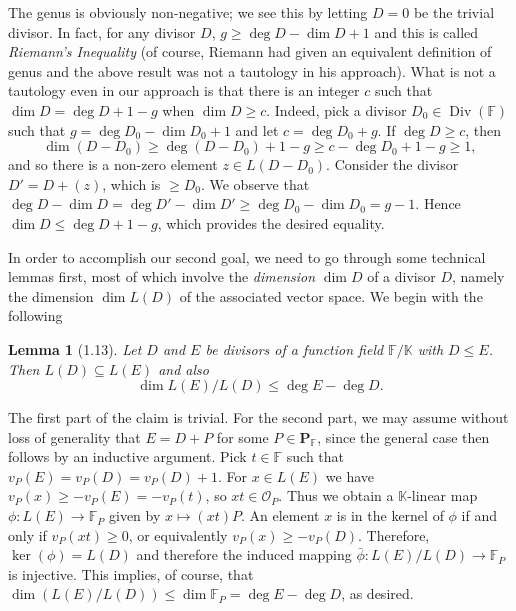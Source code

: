 \documentclass[11pt]{article}
\makeatletter
\theoremstyle{scplain}
\newtheorem*{lemma}{Lemma}
\renewenvironment{proof}[1][\proofname]{%
  \par\pushQED{\qed}\normalfont\topsep6\p@\@plus6\p@\relax
  \trivlist\item[\hskip\labelsep\scshape #1\@addpunct{.}]\ignorespaces}%
  {\popQED\endtrivlist\@endpefalse}
\DeclareMathOperator{\Div}{Div}
\makeatother
\begin{document}
\setlength{\emergencystretch}{2em}

The genus is obviously non-negative; we see this by letting $D = 0$ be the
trivial divisor. In fact, for any divisor $D$, $g \geq \deg D - \dim D + 1$ and
this is called \emph{Riemann's Inequality} (of course, Riemann had given an
equivalent definition of genus and the above result was not a tautology in his
approach). What is not a tautology even in our approach is that there is an
integer $c$ such that $\dim D = \deg D + 1 - g$ when $\dim D \geq c$. Indeed,
pick a divisor $D_0 \in \Div(\mathbb{F})$ such that
$g = \deg D_0 - \dim D_0 + 1$ and let $c = \deg D_0 + g$. If $\deg D \geq c$,
then
\[
  \dim(D - D_0) \geq \deg(D - D_0) + 1 - g
    \geq c - \deg D_0 + 1 - g \geq 1,
\]
and so there is a non-zero element $z \in L(D - D_0)$. Consider the divisor
$D' = D + (z)$, which is $\geq D_0$. We observe that
$\deg D - \dim D = \deg D' - \dim D' \geq \deg D_0 - \dim D_0 = g - 1$.
Hence $\dim D \leq \deg D + 1 - g$, which provides the desired equality.

In order to accomplish our second goal, we need to go through some technical
lemmas first, most of which involve the \emph{dimension} $\dim D$ of a divisor
$D$, namely the dimension $\dim L(D)$ of the associated vector space. We begin
with the following

\begin{lemma}[1.13]
Let $D$ and $E$ be divisors of a function field $\mathbb{F}/\mathbb{K}$ with
$D \leq E$. Then $L(D) \subseteq L(E)$ and also
\[
  \dim L(E)/L(D) \leq \deg E - \deg D.
\]
\end{lemma}

\begin{proof}
The first part of the claim is trivial. For the second part, we may assume
without loss of generality that $E = D + P$ for some
$P \in \mathbf{P}_{\mathbb{F}}$, since the general case then follows by an
inductive argument. Pick $t \in \mathbb{F}$ such that
$v_P(E) = v_P(D) = v_P(D) + 1$. For $x \in L(E)$ we have
$v_P(x) \geq -v_P(E) = -v_P(t)$, so $xt \in \mathcal{O}_P$. Thus we obtain a
$\mathbb{K}$-linear map $\phi : L(E) \longrightarrow \mathbb{F}_P$ given by
$x \mapsto (xt)P$. An element $x$ is in the kernel of $\phi$ if and only if
$v_P(xt) \geq 0$, or equivalently $v_P(x) \geq -v_P(D)$. Therefore,
$\ker(\phi) = L(D)$ and therefore the induced mapping
$\bar{\phi} : L(E)/L(D) \longrightarrow \mathbb{F}_P$ is injective. This
implies, of course, that
$\dim(L(E)/L(D)) \leq \dim \mathbb{F}_P = \deg E - \deg D$, as desired.
\end{proof}
\end{document}
